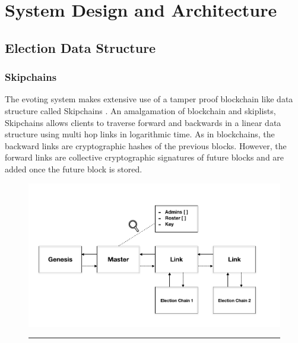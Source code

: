 
\chapter{System Design and Architecture} %

\label{Chapter2} %



\section{Election Data Structure}

\subsection{Skipchains}

The evoting system makes extensive use of a tamper proof blockchain like data structure called Skipchains \cite{skipchains}. An amalgamation of blockchain and skiplists, Skipchains allows clients to traverse forward and backwards in a linear data structure using multi hop links in logarithmic time. As in blockchains, the backward links are cryptographic hashes of the previous blocks. However, the forward links are collective cryptographic signatures of future blocks and are added once the future block is stored.

\begin{figure}[ht]
  \centering
    \includegraphics[scale=0.4]{Figures/MasterSkipchain.png}
    \rule{35em}{0.5pt}
  \caption[Master Skipchain]{}
  \label{fig:MasterSkipchain}
\end{figure}

